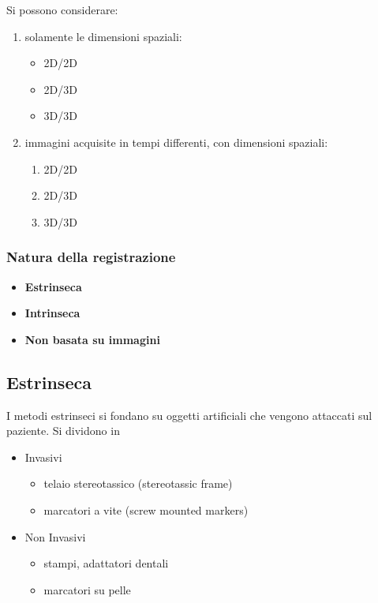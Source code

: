 Si possono considerare:
\begin{enumerate}
    \item solamente le dimensioni spaziali:
          \begin{itemize}
              \item 2D/2D
              \item 2D/3D
              \item 3D/3D
          \end{itemize}
    \item immagini acquisite in tempi differenti, con dimensioni spaziali:
          \begin{enumerate}
              \item 2D/2D
              \item 2D/3D
              \item 3D/3D
          \end{enumerate}
\end{enumerate}

\subsubsection{Natura della registrazione}
\begin{itemize}
    \item \textbf{Estrinseca}
    \item \textbf{Intrinseca}
    \item \textbf{Non basata su immagini}
\end{itemize}

\subsection{Estrinseca}
I metodi estrinseci si fondano su oggetti artificiali che vengono attaccati sul paziente. Si dividono in
\begin{itemize}
    \item Invasivi
          \begin{itemize}
              \item telaio stereotassico (stereotassic frame)
              \item marcatori a vite (screw mounted markers)
          \end{itemize}
    \item Non Invasivi
          \begin{itemize}
              \item stampi, adattatori dentali
              \item marcatori su pelle
          \end{itemize}
\end{itemize}

